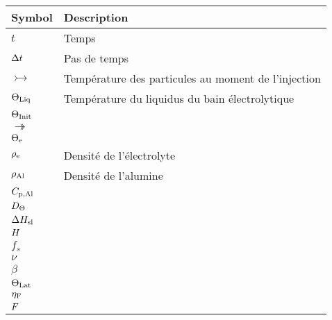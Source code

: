 \begin{tabularx}{\textwidth}{@{}ll@{}}
  \toprule
  Symbol & Description \\
  \midrule
  $t$ & Temps \\
  $\Delta t$ & Pas de temps \\
  $\tinj$ & Température des particules au moment de l'injection\\
  $\Theta_\text{Liq}$ & Température du liquidus du bain électrolytique \\
  $\Theta_\text{Init}$ & \\
  $\tsur$ & \\
  $\Theta_\mathrm{e}$ & \\
  ${\rho_\text{e}}$ & Densité de l'électrolyte\\
  ${\rho_\text{Al}}$ & Densité de l'alumine\\
  $C_{\mathrm{p,Al}}$ & \\
  $D_\Theta$ & \\
  $\Delta H_\mathrm{sl}$ & \\
  $H$ & \\
  $f_s$ & \\
  $\nu$ & \\
  $\beta$ & \\
  $\Theta_\text{Lat}$ & \\
  $\eta_\mathrm{F}$ & \\
  $F$ & \\


  \bottomrule
\end{tabularx}
